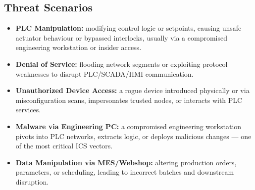 \documentclass[11pt,a4paper]{article}
\begin{document}
\subsection{Threat Scenarios}
\begin{itemize}[nosep]
  \item \textbf{PLC Manipulation:} modifying control logic or setpoints, causing unsafe actuator behaviour or bypassed interlocks, usually via a compromised engineering workstation or insider access.
  \item \textbf{Denial of Service:} flooding network segments or exploiting protocol weaknesses to disrupt PLC/SCADA/HMI communication.
  \item \textbf{Unauthorized Device Access:} a rogue device introduced physically or via misconfiguration scans, impersonates trusted nodes, or interacts with PLC services.
  \item \textbf{Malware via Engineering PC:} a compromised engineering workstation pivots into PLC networks, extracts logic, or deploys malicious changes --- one of the most critical ICS vectors.
  \item \textbf{Data Manipulation via MES/Webshop:} altering production orders, parameters, or scheduling, leading to incorrect batches and downstream disruption.
\end{itemize}
\end{document}
